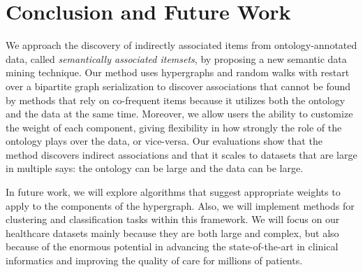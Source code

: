 \section{Conclusion and Future Work}
\label{sec:conclusion} 
We approach the discovery of indirectly associated items from ontology-annotated data, called \emph{semantically associated itemsets}, by proposing a new semantic data mining technique.  Our method uses hypergraphs and random walks with restart over a bipartite graph serialization to discover associations that cannot be found by methods that rely on co-frequent items because it utilizes both the ontology and the data at the same time.  Moreover, we allow users the ability to customize the weight of each component, giving flexibility in how strongly the role of the ontology plays over the data, or vice-versa.  Our evaluations show that the method discovers indirect associations and that it scales to datasets that are large in multiple says: the ontology can be large and the data can be large.

In future work, we will explore algorithms that suggest appropriate weights to apply to the components of the hypergraph. Also, we will implement methods for clustering and classification tasks within this framework. We will focus on our healthcare datasets mainly because they are both large and complex, but also because of the enormous potential in advancing the state-of-the-art in clinical informatics and improving the quality of care for millions of patients.
